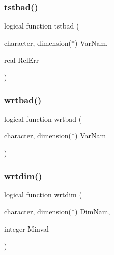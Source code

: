 \subsubsection{\texorpdfstring{tstbad()}{tstbad()}}
{\footnotesize\ttfamily logical function tstbad (\begin{DoxyParamCaption}\item[{character, dimension($\ast$)}]{Var\+Nam,  }\item[{real}]{Rel\+Err }\end{DoxyParamCaption})}

\mbox{\label{wiscombe__miev_2_err_pack_8f_a39b9b11ebe066217c5eb36dda9009bab}} 
\subsubsection{\texorpdfstring{wrtbad()}{wrtbad()}}
{\footnotesize\ttfamily logical function wrtbad (\begin{DoxyParamCaption}\item[{character, dimension($\ast$)}]{Var\+Nam }\end{DoxyParamCaption})}

\mbox{\label{wiscombe__miev_2_err_pack_8f_ac00ea4bd5d2336abbbfaa44c3822eaad}} 
\subsubsection{\texorpdfstring{wrtdim()}{wrtdim()}}
{\footnotesize\ttfamily logical function wrtdim (\begin{DoxyParamCaption}\item[{character, dimension($\ast$)}]{Dim\+Nam,  }\item[{integer}]{Minval }\end{DoxyParamCaption})}

